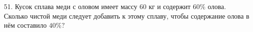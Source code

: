 51. Кусок сплава меди с оловом имеет массу 60 кг и содержит $60\%$ олова. Сколько чистой меди следует добавить к этому сплаву, чтобы содержание олова в нём составило $40\%?$\\
